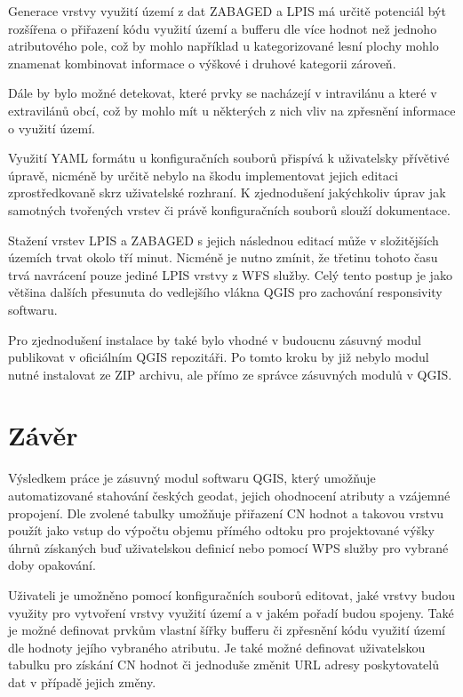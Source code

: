 \documentclass[a4paper,oneside,12pt]{book}
\begin{document}
\hspace{10mm} Generace vrstvy využití území z dat ZABAGED a LPIS má určitě potenciál být rozšířena o přiřazení kódu využití území a bufferu dle více hodnot než jednoho atributového pole, což by mohlo například u kategorizované lesní plochy mohlo znamenat kombinovat informace o výškové i druhové kategorii zároveň. 

\hspace{10mm} Dále by bylo možné detekovat, které prvky se nacházejí v intravilánu a které v extravilánů obcí, což by mohlo mít u některých z nich vliv na zpřesnění informace o využití území.

\hspace{10mm} Využití YAML formátu u konfiguračních souborů přispívá k uživatelsky přívětivé úpravě, nicméně by určitě nebylo na škodu implementovat jejich editaci zprostředkovaně skrz uživatelské rozhraní. K zjednodušení jakýchkoliv úprav jak samotných tvořených vrstev či právě konfiguračních souborů slouží dokumentace.

\hspace{10mm} Stažení vrstev LPIS a ZABAGED s jejich následnou editací může v složitějších územích trvat okolo tří minut. Nicméně je nutno zmínit, že třetinu tohoto času trvá navrácení pouze jediné LPIS vrstvy z WFS služby. Celý tento postup je jako většina dalších přesunuta do vedlejšího vlákna QGIS pro zachování responsivity softwaru. 

\hspace{10mm} Pro zjednodušení instalace by také bylo vhodné v budoucnu zásuvný modul publikovat v oficiálním QGIS repozitáři. Po tomto kroku by již nebylo modul nutné instalovat ze ZIP archivu, ale přímo ze správce zásuvných modulů v QGIS.

\chapter*{Závěr} \label{results}

\hspace{10mm} Výsledkem práce je zásuvný modul softwaru QGIS, který umožňuje automatizované stahování českých geodat, jejich ohodnocení atributy a vzájemné propojení. Dle zvolené tabulky umožňuje přiřazení CN hodnot a takovou vrstvu použít jako vstup do výpočtu objemu přímého odtoku pro projektované výšky úhrnů získaných buď uživatelskou definicí nebo pomocí WPS služby pro vybrané doby opakování.

\hspace{10mm} Uživateli je umožněno pomocí konfiguračních souborů editovat, jaké vrstvy budou využity pro vytvoření vrstvy využití území a v jakém pořadí budou spojeny. Také je možné definovat prvkům vlastní šířky bufferu či zpřesnění kódu využití území dle hodnoty jejího vybraného atributu. Je také možné definovat uživatelskou tabulku pro získání CN hodnot či jednoduše změnit URL adresy poskytovatelů dat v případě jejich změny.
\end{document}
